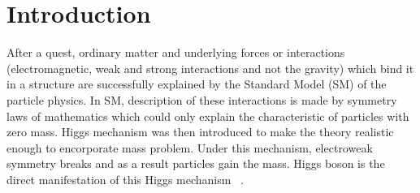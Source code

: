 \chapter{Introduction} \label{thesis_introduction}
After a quest, ordinary matter and underlying forces or interactions (electromagnetic, weak and strong interactions and not the gravity) which bind it in a structure are successfully explained by the Standard Model (SM) of the particle physics. %
In SM, description of these interactions is made by symmetry laws of mathematics which could only explain the characteristic of particles with zero mass. 
Higgs mechanism was then introduced to make the theory realistic enough to encorporate mass problem. Under this mechanism, electroweak symmetry breaks and as a result particles gain the mass. Higgs boson is the direct manifestation of this Higgs mechanism ~\cite{Reference7,Reference8,Reference9,Reference10,Reference11,Reference12}.

